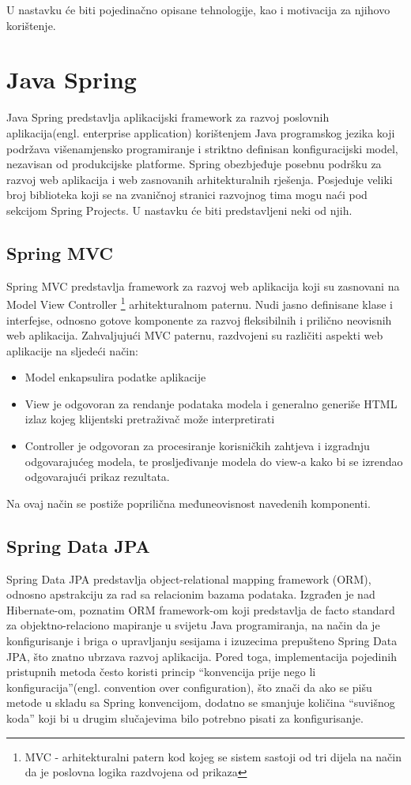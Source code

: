 \documentclass[12pt, a4paper]{report}
\theoremstyle{definition}
\begin{document}
U nastavku će biti pojedinačno opisane tehnologije, kao i motivacija za njihovo korištenje.

\section{Java Spring}
Java Spring predstavlja aplikacijski framework za razvoj poslovnih aplikacija(engl. enterprise application) korištenjem Java programskog jezika koji podržava višenamjensko programiranje i striktno definisan konfiguracijski model, nezavisan od produkcijske platforme. Spring obezbjeđuje posebnu podršku za razvoj web aplikacija i web zasnovanih arhitekturalnih rješenja. Posjeduje veliki broj biblioteka koji se na zvaničnoj stranici razvojnog tima mogu naći pod sekcijom Spring Projects. U nastavku će biti predstavljeni neki od njih.

\subsection{Spring MVC}
Spring MVC predstavlja framework za razvoj web aplikacija koji su zasnovani na Model View Controller \footnote{MVC - arhitekturalni patern kod kojeg se sistem sastoji od tri dijela na način da je poslovna logika razdvojena od prikaza} arhitekturalnom paternu. Nudi jasno definisane klase i interfejse, odnosno gotove komponente za razvoj fleksibilnih i prilično neovisnih web aplikacija.
Zahvaljujući MVC paternu, razdvojeni su različiti aspekti web aplikacije na sljedeći način:
\begin{itemize}
	\item Model enkapsulira podatke aplikacije
	\item View je odgovoran za rendanje podataka modela i generalno generiše HTML izlaz kojeg klijentski pretraživač može interpretirati
	\item Controller je odgovoran za procesiranje korisničkih zahtjeva i izgradnju odgovarajućeg modela, te prosljeđivanje modela do view-a kako bi se izrendao odgovarajući prikaz rezultata.
\end{itemize}

Na ovaj način se postiže poprilična međuneovisnost navedenih komponenti.

\subsection{Spring Data JPA}
Spring Data JPA predstavlja object-relational mapping framework (ORM), odnosno apstrakciju za rad sa relacionim bazama podataka. Izgrađen je nad Hibernate-om, poznatim ORM framework-om koji predstavlja de facto standard za objektno-relaciono mapiranje u svijetu Java programiranja, na način da je konfigurisanje i briga o upravljanju sesijama i izuzecima prepušteno Spring Data JPA, što znatno ubrzava razvoj aplikacija. Pored toga, implementacija pojedinih pristupnih metoda često koristi princip “konvencija prije nego li konfiguracija”(engl. convention over configuration), što znači da ako se pišu metode u skladu sa Spring konvencijom, dodatno se smanjuje količina “suvišnog koda” koji bi u drugim slučajevima bilo potrebno pisati za konfigurisanje. 
\end{document}
